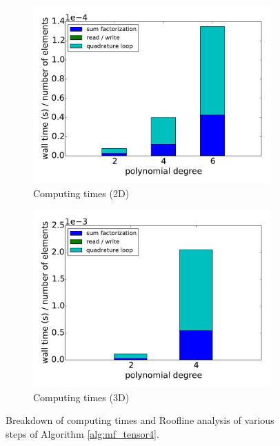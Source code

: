 \documentclass[times,doublespace]{nmeauth}
\begin{document}
{\begin{figure}[!ht]
\begin{subfigure}[b]{0.49\textwidth}
      \centering
      \includegraphics[width=\textwidth]{LIKWID_Emmy_RRZE_breakdown_stackedbar_2d.pdf}
      \caption{Computing times (2D)}
      \label{fig:breakdown_stackedbar_2d_tensor4}
  \end{subfigure}
  \begin{subfigure}[b]{0.49\textwidth}
    \centering
    \includegraphics[width=\textwidth]{LIKWID_Emmy_RRZE_breakdown_stackedbar_3d.pdf}
    \caption{Computing times (3D)}
    \label{fig:breakdown_stackedbar_3d_tensor4}
  \end{subfigure}
  \caption{Breakdown of computing times and Roofline analysis of various steps of Algorithm \ref{alg:mf_tensor4}.}%
  \label{fig:breakdown}
\end{figure}

}
\end{document}
